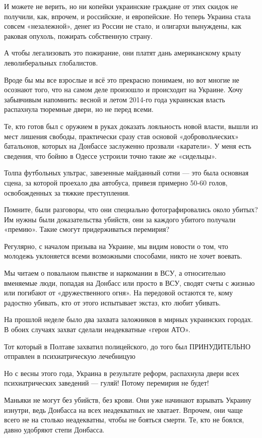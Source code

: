 И можете не верить, но ни копейки украинские граждане от этих скидок не получили, как, впрочем, и российские, и европейские.
Но теперь Украина стала совсем «незалежной», денег из России не стало, и олигархи вынуждены, как раковая опухоль, пожирать собственную страну.

А чтобы легализовать это пожирание, они платят дань американскому крылу леволиберальных глобалистов.

Вроде бы мы все взрослые и всё это прекрасно понимаем, но вот многие не осознают того, что на самом деле произошло и происходит на Украине.
Хочу забывчивым напомнить:
весной и летом 2014-го года украинская власть распахнула тюремные двери, но не перед всеми.

Те, кто готов был с оружием в руках доказать лояльность новой власти, вышли из мест лишения свободы, практически сразу став основой «добровольческих» батальонов, которых на Донбассе заслуженно прозвали «каратели».
У меня есть сведения, что бойню в Одессе устроили точно такие же «сидельцы».

Толпа футбольных ультрас, завезенные майданный сотни --- это была основная сцена, за которой проехало два автобуса, привезя примерно 50-60 голов, освобожденных за тяжкие преступления.

Помните, были разговоры, что они специально фотографировались около убитых?
Им нужны были доказательства убийств, они за каждого убитого получали «премию».
Такие смогут придерживаться перемирия?

Регулярно, с началом призыва на Украине, мы видим новости о том, что молодежь уклоняется всеми возможными способами, никто не хочет воевать.

Мы читаем о повальном пьянстве и наркомании в ВСУ, а относительно вменяемые люди, попадая на Донбасс или просто в ВСУ, сводят счеты с жизнью или погибают от «дружественного огня».
На передовой остаются те, кому радостно убивать, кто от этого испытывает экстаз, кто любит убивать.

На прошлой неделе было два захвата заложников в мирных украинских городах.
В обоих случаях захват сделали неадекватные «герои АТО».

Тот который в Полтаве захватил полицейского, до того был ПРИНУДИТЕЛЬНО отправлен в психиатрическую лечебницую

Но с весны этого года, Украина в результате реформ, распахнула двери всех психиатрических заведений --- гуляй!
Потому перемирия не будет!

Маньяки не могут без убийств, без крови. Они уже начинают взрывать Украину изнутри, ведь Донбасса на всех неадекватных не хватает.
Впрочем, они чаще всего не на столько неадекватны, чтобы не бояться смерти.
Те, кто не боялся, давно удобряют степи Донбасса.

